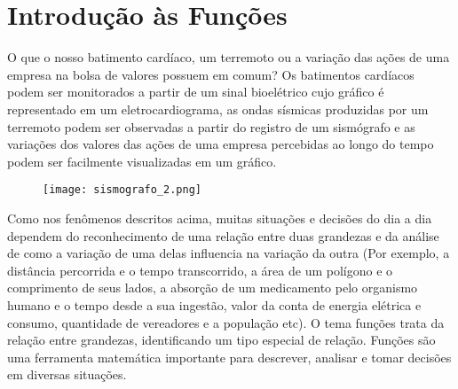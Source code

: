 \documentclass[extrafontsizes, twoside, 11pt, openright, final]{memoir}
\begin{document}





\chapter{Introdução às Funções\label{chap-funcoes}}




O que o nosso batimento cardíaco, um terremoto ou a variação das ações de uma empresa na bolsa de valores possuem em comum? Os batimentos cardíacos podem ser monitorados a partir de um sinal bioelétrico cujo gráfico é representado em um eletrocardiograma, as ondas sísmicas produzidas por um terremoto podem ser observadas a partir do registro de um sismógrafo e as variações dos valores das ações de uma empresa percebidas ao longo do tempo podem ser facilmente visualizadas em um gráfico.

\begin{figure}[H]
	\begin{center}
		\centering

		\noindent\texttt{[image: sismografo\_2.png]}
	\end{center}
\end{figure}

Como nos fenômenos descritos acima, muitas situações e decisões do dia a dia dependem do reconhecimento de uma relação entre duas grandezas e da análise de como a variação de uma delas influencia na variação da outra (Por exemplo, a distância percorrida e o tempo transcorrido, a área de um polígono e o comprimento de seus lados, a absorção de um medicamento pelo organismo humano e o tempo desde a sua ingestão, valor da conta de energia elétrica e consumo, quantidade de vereadores e a população etc). O tema funções trata da relação entre grandezas, identificando um tipo especial de relação. Funções são uma ferramenta matemática importante para descrever, analisar e tomar decisões em diversas situações.
\end{document}
